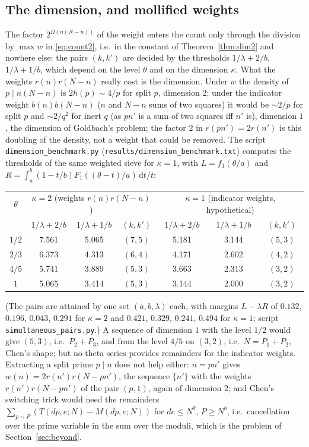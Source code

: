 ﻿\documentclass[11pt]{amsart}
\theoremstyle{remark}
\newcommand{\dd}{\mathrm{d}}
\begin{document}
\subsection{The dimension, and mollified weights}\label{subsec:dimension}
The factor $2^{\Omega(n(N-n))}$ of the weight enters the count only through the division by $\max w$ in \eqref{eq:count2}, i.e.\ in the constant of Theorem~\ref{thm:dim2} and nowhere else: the pairs $(k,k')$ are decided by the thresholds $1/\lambda+2/b$, $1/\lambda+1/b$, which depend on the level $\theta$ and on the dimension $\kappa$. What the weights $r(n)r(N-n)$ really cost is the dimension. Under $w$ the density of $p\mid n(N-n)$ is $2h(p)\sim4/p$ for split $p$, dimension $2$; under the indicator weight $b(n)b(N-n)$ ($n$ and $N-n$ sums of two squares) it would be $\sim2/p$ for split $p$ and $\sim2/q^2$ for inert $q$ (as $pn'$ is a sum of two squares iff $n'$ is), dimension $1$, the dimension of Goldbach's problem; the factor $2$ in $r(pn')=2r(n')$ is this doubling of the density, not a weight that could be removed. The script \texttt{dimension\_benchmark.py} (\texttt{results/dimension\_benchmark.txt}) computes the thresholds of the same weighted sieve for $\kappa=1$, with $L=f_1(\theta/a)$ and $R=\int_a^b(1-t/b)F_1((\theta-t)/a)\,\dd t/t$:
\begin{center}\small
\begin{tabular}{c|ccc|ccc}
\hline
$\theta$ & \multicolumn{3}{c|}{$\kappa=2$ (weights $r(n)r(N-n)$)} & \multicolumn{3}{c}{$\kappa=1$ (indicator weights, hypothetical)}\\
 & $1/\lambda+2/b$ & $1/\lambda+1/b$ & $(k,k')$ & $1/\lambda+2/b$ & $1/\lambda+1/b$ & $(k,k')$\\
\hline
$1/2$ & 7.561 & 5.065 & $(7,5)$ & 5.181 & 3.144 & $(5,3)$\\
$2/3$ & 6.373 & 4.313 & $(6,4)$ & 4.171 & 2.602 & $(4,2)$\\
$4/5$ & 5.741 & 3.889 & $(5,3)$ & 3.663 & 2.313 & $(3,2)$\\
$1$ & 5.065 & 3.414 & $(5,3)$ & 3.144 & 2.000 & $(3,2)$\\
\hline
\end{tabular}
\end{center}
(The pairs are attained by one set $(a,b,\lambda)$ each, with margins $L-\lambda R$ of $0.132$, $0.196$, $0.043$, $0.291$ for $\kappa=2$ and $0.421$, $0.329$, $0.241$, $0.494$ for $\kappa=1$; script \texttt{simultaneous\_pairs.py}.) A sequence of dimension $1$ with the level $1/2$ would give $(5,3)$, i.e.\ $P_2+P_3$, and from the level $4/5$ on $(3,2)$, i.e.\ $N=P_1+P_2$, Chen's shape; but no theta series provides remainders for the indicator weights. Extracting a split prime $p\mid n$ does not help either: $n=pn'$ gives $w(n)=2r(n')r(N-pn')$, the sequence $\{n'\}$ with the weights $r(n')r(N-pn')$ of the pair $(p,1)$, again of dimension $2$; and Chen's switching trick would need the remainders $\sum_{p\sim P}(T(dp,e;N)-M(dp,e;N))$ for $de\le N^\theta$, $P\ge N^b$, i.e.\ cancellation over the prime variable in the sum over the moduli, which is the problem of Section~\ref{sec:beyond}.
\end{document}
